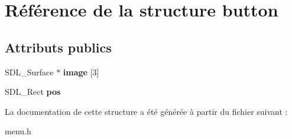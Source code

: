 \hypertarget{structbutton}{}\section{Référence de la structure button}
\label{structbutton}
\subsection*{Attributs publics}
\begin{DoxyCompactItemize}
\item 
\mbox{\label{structbutton_a245136de5539a7c34e7709c893b0ce7f}} 
S\+D\+L\+\_\+\+Surface $\ast$ {\bfseries image} \mbox{[}3\mbox{]}
\item 
\mbox{\label{structbutton_a283ac65aff45ef683eeabb8c3b65a51a}} 
S\+D\+L\+\_\+\+Rect {\bfseries pos}
\end{DoxyCompactItemize}


La documentation de cette structure a été générée à partir du fichier suivant \+:\begin{DoxyCompactItemize}
\item 
menu.\+h\end{DoxyCompactItemize}
